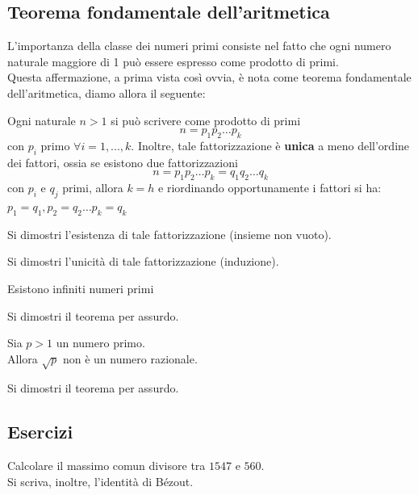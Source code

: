 \begin{flushleft}
\subsection{Teorema fondamentale dell'aritmetica}
L'importanza della classe dei numeri primi consiste nel fatto che ogni numero naturale maggiore di 1 può essere espresso come prodotto di primi.\\
Questa affermazione, a prima vista così ovvia, è nota come teorema fondamentale dell'aritmetica, diamo allora il seguente:
\begin{theorem}
Ogni naturale $n>1$ si può scrivere come prodotto di primi
\[n = p_1p_2\hdots p_k\]
con $p_i$ primo $\forall i= 1,...,k$.
Inoltre, tale fattorizzazione è \textbf{unica} a meno dell'ordine dei fattori, ossia se esistono due fattorizzazioni
\[n = p_1p_2\hdots p_k = q_1q_2\hdots q_k\]
con $p_i$ e $q_j$ primi, allora $k=h$ e riordinando opportunamente i fattori si ha: $p_1=q_1,p_2=q_2\hdots p_k=q_k$
\end{theorem}
\begin{esercizio}
Si dimostri l'esistenza di tale fattorizzazione (insieme non vuoto).
\end{esercizio}
\vspace{200px}
\begin{esercizio}
Si dimostri l'unicità di tale fattorizzazione (induzione).
\end{esercizio}
\vspace{200px}

\begin{theorem}
Esistono infiniti numeri primi
\end{theorem}
\begin{esercizio}
Si dimostri il teorema per assurdo.
\end{esercizio}
\vspace{200px}


\begin{theorem}
Sia $p>1$ un numero primo.\\
Allora $\sqrt{p}$ non è un numero razionale.
\end{theorem}
\begin{esercizio}
Si dimostri il teorema per assurdo.
\end{esercizio}
\vspace{200px}




\subsection{Esercizi}
\begin{esercizio}
Calcolare il massimo comun divisore tra $1547$ e $560$.\\
Si scriva, inoltre, l'identità di Bézout.
\end{esercizio}
\vspace{150px}


\end{flushleft}
